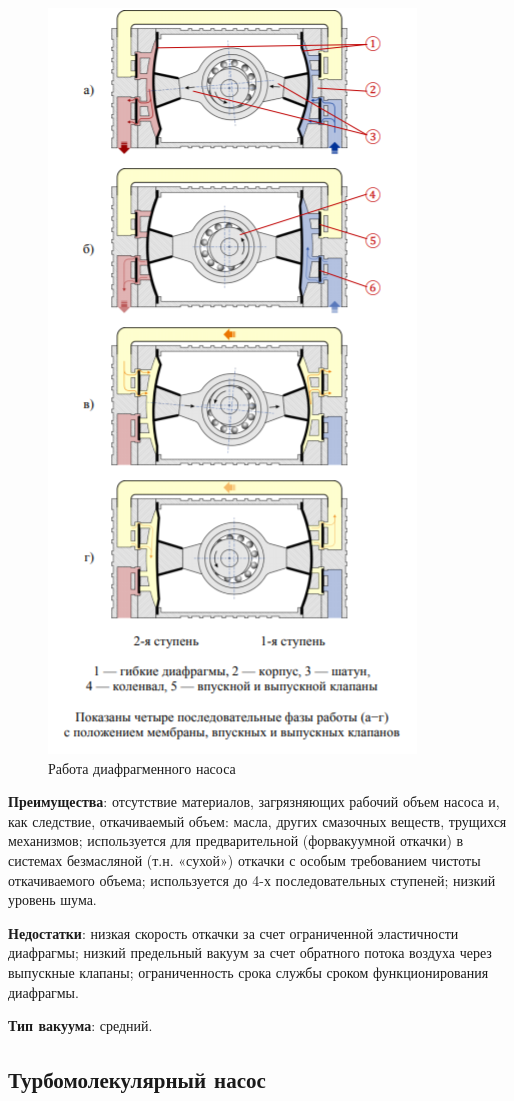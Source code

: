 \documentclass[a4paper, 12pt]{article} %
\begin{document}
\begin{figure}[h]
    \centering
    \includegraphics[width = 7.5 cm]{ДН}
    \caption{Работа диафрагменного насоса}
    \label{fig:vac}
\end{figure}

\textbf{Преимущества}: отсутствие материалов, загрязняющих рабочий
объем насоса и, как следствие, откачиваемый объем: масла, других смазочных веществ, трущихся механизмов; используется для предварительной (форвакуумной откачки) в системах безмасляной (т.н. «сухой») откачки с особым требованием чистоты откачиваемого объема; используется до 4-х последовательных ступеней; низкий уровень шума.

\textbf{Недостатки}: низкая скорость откачки за счет ограниченной эластичности диафрагмы; низкий предельный вакуум за счет обратного потока воздуха через выпускные клапаны; ограниченность срока службы
сроком функционирования диафрагмы.

\textbf{Тип вакуума}: средний.

\subsection{Турбомолекулярный насос}
\end{document}
